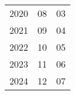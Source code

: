 \documentclass[10pt,a4paper]{article}
\begin{document}
	\begin{tabular}{lll}
		2020 & 08 & 03\\
		2021 & 09 & 04\\
		2022 & 10 & 05\\
		2023 & 11 & 06\\
		2024 & 12 & 07
	\end{tabular}
\end{document}
